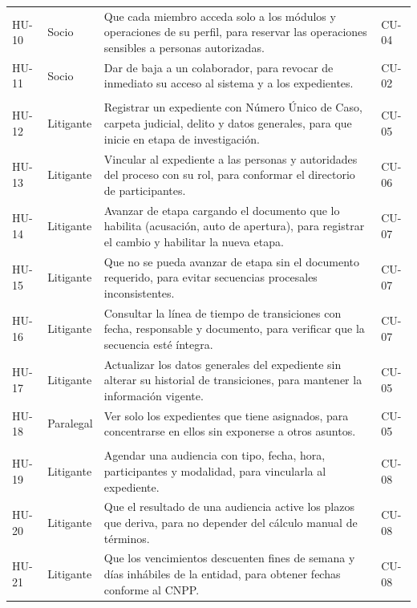{\begin{longtable}{@{}p{1.6cm}L{2.35cm}L{10.25cm}>{\raggedright\arraybackslash}p{1.5cm}@{}}
  HU-10 & Socio & Que cada miembro acceda solo a los módulos y operaciones de su perfil, para reservar las operaciones sensibles a personas autorizadas. & CU-04 \\
  HU-11 & Socio & Dar de baja a un colaborador, para revocar de inmediato su acceso al sistema y a los expedientes. & CU-02 \\
  \addlinespace
  \\
  HU-12 & Litigante & Registrar un expediente con Número Único de Caso, carpeta judicial, delito y datos generales, para que inicie en etapa de investigación. & CU-05 \\
  HU-13 & Litigante & Vincular al expediente a las personas y autoridades del proceso con su rol, para conformar el directorio de participantes. & CU-06 \\
  HU-14 & Litigante & Avanzar de etapa cargando el documento que lo habilita (acusación, auto de apertura), para registrar el cambio y habilitar la nueva etapa. & CU-07 \\
  HU-15 & Litigante & Que no se pueda avanzar de etapa sin el documento requerido, para evitar secuencias procesales inconsistentes. & CU-07 \\
  HU-16 & Litigante & Consultar la línea de tiempo de transiciones con fecha, responsable y documento, para verificar que la secuencia esté íntegra. & CU-07 \\
  HU-17 & Litigante & Actualizar los datos generales del expediente sin alterar su historial de transiciones, para mantener la información vigente. & CU-05 \\
  HU-18 & Paralegal & Ver solo los expedientes que tiene asignados, para concentrarse en ellos sin exponerse a otros asuntos. & CU-05 \\
  \addlinespace
  \\
  HU-19 & Litigante & Agendar una audiencia con tipo, fecha, hora, participantes y modalidad, para vincularla al expediente. & CU-08 \\
  HU-20 & Litigante & Que el resultado de una audiencia active los plazos que deriva, para no depender del cálculo manual de términos. & CU-08 \\
  HU-21 & Litigante & Que los vencimientos descuenten fines de semana y días inhábiles de la entidad, para obtener fechas conforme al CNPP. & CU-08 \\

\end{longtable}}

